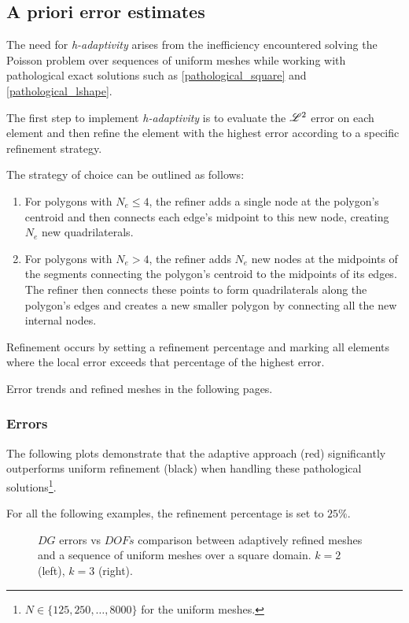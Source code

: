 \subsection{A priori error estimates}

The need for \textit{h-adaptivity} arises from the inefficiency encountered solving the Poisson problem over sequences of uniform meshes while working with pathological exact solutions such as \eqref{pathological_square} and \eqref{pathological_lshape}.

The first step to implement \textit{h-adaptivity} is to evaluate the $\mathscr{L}^2$ error on each element and then refine the element with the highest error according to a specific refinement strategy.

The strategy of choice can be outlined as follows:

\begin{enumerate}
    \item For polygons with $N_e \leq 4$, the refiner adds a single node at the polygon's centroid and then connects each edge's midpoint to this new node, creating $N_e$ new quadrilaterals.
    \item For polygons with $N_e > 4$, the refiner adds $N_e$ new nodes at the midpoints of the segments connecting the polygon's centroid to the midpoints of its edges. The refiner then connects these points to form quadrilaterals along the polygon's edges and creates a new smaller polygon by connecting all the new internal nodes.
\end{enumerate}

Refinement occurs by setting a refinement percentage and marking all elements where the local error exceeds that percentage of the highest error.

Error trends and refined meshes in the following pages.

\newpage
\subsubsection{Errors}

The following plots demonstrate that the adaptive approach (red) significantly outperforms uniform refinement (black) when handling these pathological solutions\footnote{$N \in \{125, 250, \dots, 8000\}$ for the uniform meshes.}.

For all the following examples, the refinement percentage is set to $25\%$.

\begin{figure}[!ht]
	\begin{subfigure}[b]{0.45\textwidth}
		
	\end{subfigure}
	\hfill
	\begin{subfigure}[b]{0.45\textwidth}
		
	\end{subfigure}
    \caption{$DG$ errors vs $DOFs$ comparison between adaptively refined meshes and a sequence of uniform meshes over a square domain. $k = 2$ (left), $k = 3$ (right).}
\end{figure}

